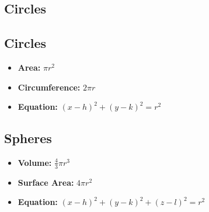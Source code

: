 \subsection{Circles}

\subsection{Circles}

\begin{itemize}
    \item \textbf{Area: } $\pi r^2$
    \item \textbf{Circumference: } $2 \pi r$
    \item \textbf{Equation: } $(x-h)^2 + (y-k)^2 = r^2$
\end{itemize}

\subsection{Spheres}

\begin{itemize}
    \item \textbf{Volume: } $\frac{4}{3} \pi r^3$
    \item \textbf{Surface Area: } $4 \pi r^2$
    \item \textbf{Equation: } $(x-h)^2 + (y-k)^2 + (z-l)^2 = r^2$
\end{itemize}